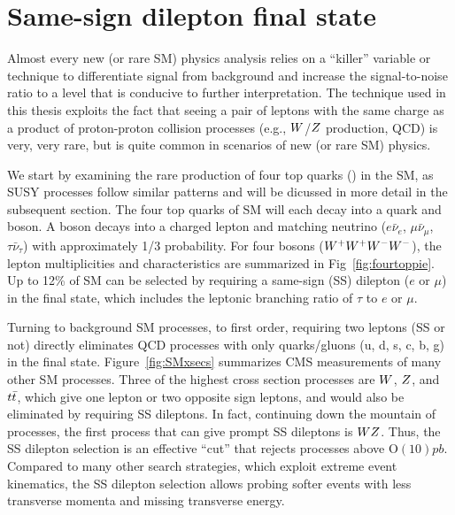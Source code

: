 \chapter{Same-sign dilepton final state}
\label{chap:ssdl}

Almost every new (or rare SM) physics analysis relies on a ``killer'' variable
or technique
to differentiate signal from background and increase the signal-to-noise
ratio to a level that is conducive to further interpretation.
The technique used in this thesis exploits the fact that seeing a pair of leptons
with the same charge as a product of proton-proton collision processes
(e.g., $W$/$Z$ production, QCD) is very, very rare,
but is quite common in scenarios of new (or rare SM) physics.

We start by examining the rare production of four top quarks (\tttt) in the SM,
as SUSY processes follow
similar patterns and will be dicussed in more detail in the subsequent section.
The four top quarks of SM \tttt will each decay into a \PQb quark and \PW boson.
A \PW boson decays into a charged lepton and matching neutrino 
($e\bar\nu_e$, $\mu\bar\nu_\mu$, $\tau\bar\nu_\tau$) with approximately 1/3 probability.
For four \PW bosons ($W^+W^+W^-W^-$), the lepton multiplicities and characteristics are summarized in
Fig~\ref{fig:fourtoppie}. Up to 12\% of SM \tttt can be selected by requiring
a same-sign (SS) dilepton ($e$ or $\mu$) in the final state, which includes the
leptonic branching ratio of $\tau$ to $e$ or $\mu$. 

Turning to background SM processes, to first order, requiring two leptons
(SS or not) directly eliminates QCD processes  with only quarks/gluons (u, d, s, c, b, g) in the final state.
Figure~\ref{fig:SMxsecs} summarizes
CMS measurements of many other SM processes.
Three of the highest cross section processes 
are $W$, $Z$, and $t\bar{t}$, which give one lepton or two opposite sign leptons,
and would also be eliminated by requiring SS dileptons.
In fact, continuing down the mountain of processes, the first process that can give prompt
SS dileptons is $WZ$. Thus, the SS dilepton selection is an effective
``cut'' that rejects processes above $\mathrm{O}(10)\unit{pb}$. Compared to many other
search strategies, which exploit extreme event kinematics, the SS dilepton selection allows probing softer
events with less transverse momenta and missing transverse energy.




